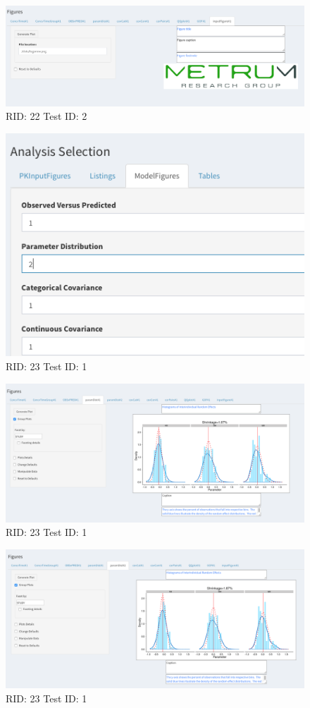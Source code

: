 \begin{figure}[H]
\includegraphics[width=.8\textwidth]{screencaps/22-2-1.png}
\caption{RID: 22 Test ID: 2}
\end{figure}
\begin{figure}[H]
\includegraphics[width=.8\textwidth]{screencaps/23-1-1.png}
\caption{RID: 23 Test ID: 1}
\end{figure}
\begin{figure}[H]
\includegraphics[width=.8\textwidth]{screencaps/23-1-2.png}
\caption{RID: 23 Test ID: 1}
\end{figure}
\begin{figure}[H]
\includegraphics[width=.8\textwidth]{screencaps/23-1-3.png}
\caption{RID: 23 Test ID: 1}
\end{figure}
